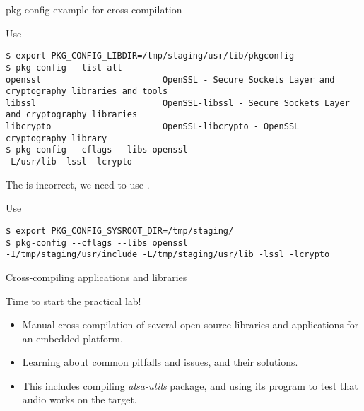 \begin{frame}[fragile]{pkg-config example for cross-compilation}
  \begin{block}{Use }
    {\tiny
\begin{verbatim}
$ export PKG_CONFIG_LIBDIR=/tmp/staging/usr/lib/pkgconfig
$ pkg-config --list-all
openssl                        OpenSSL - Secure Sockets Layer and cryptography libraries and tools
libssl                         OpenSSL-libssl - Secure Sockets Layer and cryptography libraries
libcrypto                      OpenSSL-libcrypto - OpenSSL cryptography library
$ pkg-config --cflags --libs openssl
-L/usr/lib -lssl -lcrypto
\end{verbatim}
    }
  \end{block}

  The  is incorrect, we need to use
  .

  \begin{block}{Use }
    {\tiny
\begin{verbatim}
$ export PKG_CONFIG_SYSROOT_DIR=/tmp/staging/
$ pkg-config --cflags --libs openssl
-I/tmp/staging/usr/include -L/tmp/staging/usr/lib -lssl -lcrypto
\end{verbatim}
    }
  \end{block}
\end{frame}

\setuplabframe
{Cross-compiling applications and libraries}
{
  Time to start the practical lab!
  \begin{itemize}
  \item Manual cross-compilation of several open-source libraries and
    applications for an embedded platform.
  \item Learning about common pitfalls and issues, and their
    solutions.
  \item This includes compiling {\em alsa-utils} package,
    and using its  program to test that
    audio works on the target.
  \end{itemize}
}
